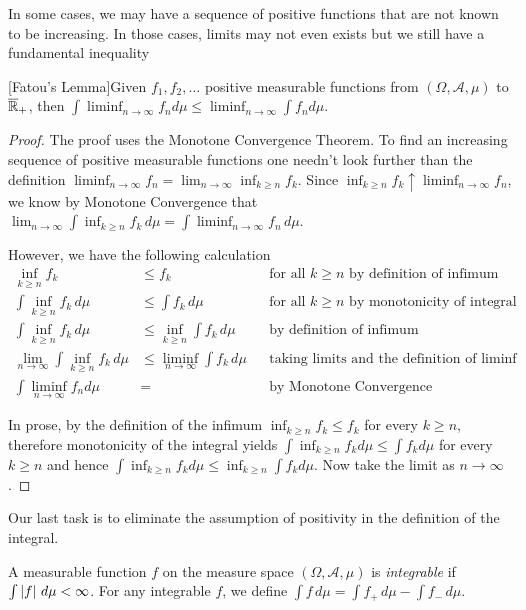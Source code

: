  In some cases, we may have a sequence of positive functions that are not known
to be increasing.  In those cases, limits may not even exists but we
still have a fundamental inequality
\begin{thm}\label{Fatou}[Fatou's Lemma]Given $f_1, f_2, \dots$
  positive measurable functions from
  $(\Omega, \mathcal{A}, \mu)$ to $\overline{\mathbb{R}}_+$,
  then $\int \liminf_{n \to \infty} f_n d \mu \leq \liminf_{n \to
    \infty} \int f_n d \mu$.
\end{thm}
\begin{proof}The proof uses the Monotone Convergence Theorem.  To find
  an increasing sequence of positive measurable functions one needn't
  look further than the definition $\liminf_{n \to \infty} f_n =
  \lim_{n \to \infty} \inf_{k \geq n} f_k$.  Since $\inf_{k \geq n}
  f_k \uparrow \liminf_{n \to \infty} f_n$, we know by Monotone
  Convergence that $\lim_{n \to \infty} \int \inf_{k \geq n}
  f_k \, d \mu = \int \liminf_{n \to \infty} f_n \, d \mu$.  

However, we have the following calculation
\begin{align*}
\inf_{k \geq n} f_k &\leq f_k  & &\textrm{for all $k\geq n$ by
  definition of infimum} \\
\int \inf_{k \geq n} f_k \, d\mu &\leq \int f_k \,
d \mu & &\textrm{for all $k\geq n$ by
  monotonicity of integral} \\
\int \inf_{k \geq n} f_k \, d\mu &\leq \inf_{k \geq n} \int f_k \,
d \mu & &\textrm{by
  definition of infimum} \\
\lim_{n \to \infty} \int
\inf_{k \geq n} f_k \, d\mu &\leq \liminf_{n \to \infty} \int f_k \,
d \mu & &\textrm{taking limits and the
  definition of $\liminf$} \\
\int \liminf_{n \to \infty} f_n d \mu &= & & \textrm{by Monotone Convergence}
\end{align*}

In prose, by the  definition of the infimum $\inf_{k \geq n} f_k \leq f_k$ for every
  $k \geq n$, therefore monotonicity of the integral yields $\int
  \inf_{k \geq n} f_k d \mu \leq \int f_k d \mu$ for every
  $k \geq n$ and hence $\int
  \inf_{k \geq n} f_k d \mu \leq \inf_{k\geq n} \int f_k d \mu$.  Now
  take the limit as $n \to \infty$.
\end{proof}

Our last task is to eliminate the assumption of positivity in the
definition of the integral.  
\begin{defn}A measurable function $f$ on the measure space $(\Omega,
  \mathcal{A}, \mu)$ is \emph{integrable} if $\int \left \vert f \right \vert \, d\mu <
  \infty$.  For any integrable $f$, we define $\int f \, d \mu = \int
  f_+ \, d\mu - \int f_{-} \, d \mu$.
\end{defn}


